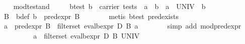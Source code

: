 \begin{isabellebody}
\endisatagproof
{\isafoldproof}%
%
\isadelimproof
\isanewline
%
\endisadelimproof
\isanewline
\ \ \isamarkupfalse%
\ mod{}test{}and{}\isanewline
\ \ \ \ \ b{}test{}\ {}b\ {}\ carrier\ tests{}\ \ {}a\ {}\ b\ {}\ a\ {}\ UNIV\ {}\ b{}\isanewline
%
\isadelimproof
\ \ %
\endisadelimproof
%
\isatagproof
{}\isamarkupfalse%
\ {}\isanewline
\ \ \ \ \isamarkupfalse%
\ B\ \ b{}def{}\ {}b\ {}\ pred{}expr\ B{}\isanewline
\ \ \ \ \ \ \isamarkupfalse%
\ {}metis\ b{}test\ pred{}exists{}\isanewline
\ \ \ \ \isamarkupfalse%
\ {}a\ {}\ pred{}expr\ B\ {}\ filter{}set\ {}eval{}bexpr\ D\ B{}\ a{}\isanewline
\ \ \ \ \ \ \isamarkupfalse%
\ {}simp\ add{}\ mod{}pred{}expr{}\isanewline
\ \ \ \ \isamarkupfalse%
\ \isamarkupfalse%
\ {}{}{}{}\ {}\ a\ {}\ filter{}set\ {}eval{}bexpr\ D\ B{}\ UNIV{}\isanewline

\end{isabellebody}
